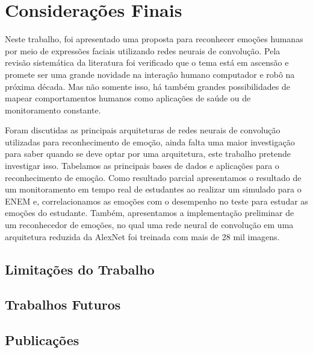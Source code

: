 \chapter{Considerações Finais}\label{sec:conclusao}
Neste trabalho, foi apresentado uma proposta para reconhecer emoções humanas por meio de expressões faciais utilizando redes neurais de convolução. Pela revisão sistemática da literatura foi verificado que o tema está em ascensão e promete ser uma grande novidade na interação humano computador e robô na próxima década. Mas não somente isso, há também grandes possibilidades de mapear comportamentos humanos como aplicações de saúde ou de monitoramento constante. 

Foram discutidas as principais arquiteturas de redes neurais de convolução utilizadas para reconhecimento de emoção, ainda falta uma maior investigação para saber quando se deve optar por uma arquitetura, este trabalho pretende investigar isso. Tabelamos as principais bases de dados e aplicações para o reconhecimento de emoção. Como resultado parcial apresentamos o resultado de um monitoramento em tempo real de estudantes ao realizar um simulado para o ENEM e, correlacionamos as emoções com o desempenho no teste para estudar as emoções do estudante. Também, apresentamos a implementação preliminar de um reconhecedor de emoções, no qual uma rede neural de convolução em uma arquitetura reduzida da AlexNet foi treinada com mais de 28 mil imagens.  

\section{Limitações do Trabalho}

\section{Trabalhos Futuros}

\section{Publicações}